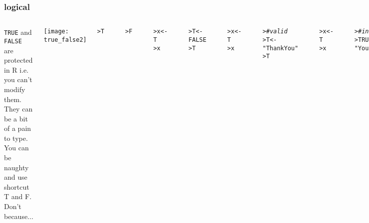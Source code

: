 \documentclass[13pt,aspectratio=169]{beamer}\usepackage[]{graphicx}\usepackage[]{color}
\makeatletter
\newcommand{\hlnum}[1]{\textcolor[rgb]{0.686,0.059,0.569}{#1}}%
\newcommand{\hlstr}[1]{\textcolor[rgb]{0.192,0.494,0.8}{#1}}%
\newcommand{\hlcom}[1]{\textcolor[rgb]{0.678,0.584,0.686}{\textit{#1}}}%
\newcommand{\hlstd}[1]{\textcolor[rgb]{0.345,0.345,0.345}{#1}}%
\newcommand{\hlkwb}[1]{\textcolor[rgb]{0.69,0.353,0.396}{#1}}%
\newenvironment{kframe}{%
 \def\at@end@of@kframe{}%
 \ifinner\ifhmode%
  \def\at@end@of@kframe{\end{minipage}}%
  \begin{minipage}{\columnwidth}%
 \fi\fi%
 \def\FrameCommand##1{\hskip\@totalleftmargin \hskip-\fboxsep
 \colorbox{shadecolor}{##1}\hskip-\fboxsep
     \hskip-\linewidth \hskip-\@totalleftmargin \hskip\columnwidth}%
 \MakeFramed {\advance\hsize-\width
   \@totalleftmargin\z@ \linewidth\hsize
   \@setminipage}}%
 {\par\unskip\endMakeFramed%
 \at@end@of@kframe}
\newenvironment{knitrout}{}{} %
\renewcommand{\tt}[1]{\texttt{#1}}
\renewenvironment{knitrout}{\setlength{\topsep}{0mm}}{}
\makeatother
\begin{document}
\begin{frame}[fragile]
    \frametitle{logical}
    \begin{columns}[t]
	\tt{TRUE} and \tt{FALSE} are protected in R i.e. you can't modify them.
	They can be a bit of a pain to type. You can be naughty and use
	shortcut T and F. \alert{Don't} because...

	\vskip6pt
	\texttt{[image: true\_false2]}
\begin{knitrout}\small
{}\color{fgcolor}\begin{kframe}
\begin{alltt}
\hlstd{> }\hlstd{T}
\end{alltt}
\begin{verbatim}
[1] TRUE
\end{verbatim}
\begin{alltt}
\hlstd{> }\hlstd{F}
\end{alltt}
\begin{verbatim}
[1] FALSE
\end{verbatim}
\begin{alltt}
\hlstd{> }\hlstd{x} \hlkwb{<-} \hlstd{T}
\hlstd{> }\hlstd{x}
\end{alltt}
\begin{verbatim}
[1] TRUE
\end{verbatim}
\begin{alltt}
\hlstd{> }\hlstd{T} \hlkwb{<-} \hlnum{FALSE}
\hlstd{> }\hlstd{T}
\end{alltt}
\begin{verbatim}
[1] FALSE
\end{verbatim}
\begin{alltt}
\hlstd{> }\hlstd{x} \hlkwb{<-} \hlstd{T}
\hlstd{> }\hlstd{x}
\end{alltt}
\begin{verbatim}
[1] FALSE
\end{verbatim}
\end{kframe}
\end{knitrout}


\begin{knitrout}\small
{}\color{fgcolor}\begin{kframe}
\begin{alltt}
\hlstd{> }\hlcom{# valid}
\hlstd{> }\hlstd{T} \hlkwb{<-} \hlstr{"Thank You"}
\hlstd{> }\hlstd{T}
\end{alltt}
\begin{verbatim}
[1] "Thank You"
\end{verbatim}
\begin{alltt}
\hlstd{> }\hlstd{x} \hlkwb{<-} \hlstd{T}
\hlstd{> }\hlstd{x}
\end{alltt}
\begin{verbatim}
[1] "Thank You"
\end{verbatim}
\begin{alltt}
\hlstd{> }\hlcom{# invalid}
\hlstd{> }\hlnum{TRUE} \hlkwb{<-} \hlstr{"You're Welcome"}
\end{alltt}



\end{kframe}
\end{knitrout}
\end{columns}
\end{frame}
\end{document}
